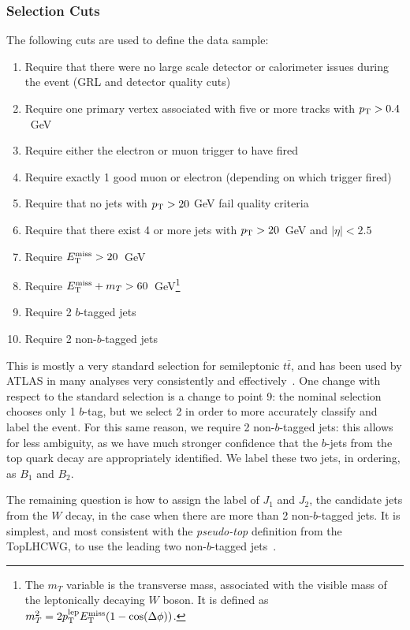 \subsubsection{Selection Cuts}

The following cuts are used to define the data sample:
%
\begin{enumerate}
\item Require that there were no large scale detector or calorimeter issues during the event (GRL and detector quality cuts)
\item Require one primary vertex associated with five or more tracks with $p_{\text{T}} > 0.4$~GeV
\item Require either the electron or muon trigger to have fired
\item Require exactly 1 good muon or electron (depending on which trigger fired)
\item Require that no jets with $p_{\text{T}} > 20$ GeV fail quality criteria
\item Require that there exist 4 or more jets with $p_{\text{T}} > 20$~GeV and $|\eta| < 2.5$
\item Require $E_{\text{T}}^{\text{miss}} > 20$~GeV
\item Require $E_{\text{T}}^{\text{miss}} + m_T > 60$~GeV\footnote{The $m_T$ variable is the transverse mass, associated with the visible mass of the leptonically decaying $W$ boson. It is defined as $m_T^2 = 2 p_{\text{T}}^{\mathrm{lep}} E_{\text{T}}^{\text{miss}} (1 - \cos(\Delta \phi))$.}
\item Require 2 $b$-tagged jets
\item Require 2 non-$b$-tagged jets
\end{enumerate}
%
This is mostly a very standard selection for semileptonic $t\bar{t}$, and has been used by ATLAS in many analyses very consistently and effectively~\cite{Aad:2015fna,ATLAS-CONF-2012-149}. One change with respect to the standard selection is a change to point 9: the nominal selection chooses only 1 $b$-tag, but we select 2 in order to more accurately classify and label the event. For this same reason, we require 2 non-$b$-tagged jets: this allows for less ambiguity, as we have much stronger confidence that the $b$-jets from the top quark decay are appropriately identified. We label these two jets, in \pt ordering, as $B_1$ and $B_2$.


The remaining question is how to assign the label of $J_1$ and $J_2$, the candidate jets from the $W$ decay, in the case when there are more than 2 non-$b$-tagged jets. It is simplest, and most consistent with the \textit{pseudo-top} definition from the {\sc TopLHCWG}, to use the leading two non-$b$-tagged jets~\cite{pseudotop,Aad:2015eia}.

